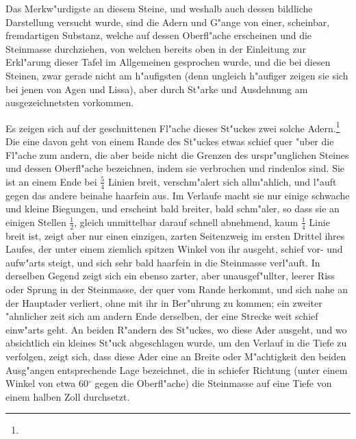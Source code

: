 \documentclass[a4paper, 11pt, oneside, german]{article}
\begin{document}
Das Merkw"urdigste an diesem Steine, und weshalb auch dessen bildliche Darstellung versucht wurde, sind die Adern und G"ange von einer, scheinbar, fremdartigen Substanz, welche auf dessen Oberfl"ache erscheinen und die Steinmasse durchziehen, von welchen bereits oben in der Einleitung zur Erkl"arung dieser Tafel im Allgemeinen gesprochen wurde, und die bei diesen Steinen, zwar gerade nicht am h"aufigsten (denn ungleich h"aufiger zeigen sie sich bei jenen von Agen und Lissa), aber durch St"arke und Ausdehnung am ausgezeichnetsten vorkommen.

Es zeigen sich auf der geschnittenen Fl"ache dieses St"uckes zwei solche Adern.\footnote{} Die eine davon geht von einem Rande des St"uckes etwas schief quer "uber die Fl"ache zum andern, die aber beide nicht die Grenzen des urspr"unglichen Steines und dessen Oberfl"ache bezeichnen, indem sie verbrochen und rindenlos sind. Sie ist an einem Ende bei $\frac{5}{4}$ Linien breit, verschm"alert sich allm"ahlich, und l"auft gegen das andere beinahe haarfein aus. Im Verlaufe macht sie nur einige schwache und kleine Biegungen, und erscheint bald breiter, bald schm"aler, so dass sie an einigen Stellen $\frac{1}{2}$, gleich unmittelbar darauf schnell abnehmend, kaum $\frac{1}{4}$ Linie breit ist, zeigt aber nur einen einzigen, zarten Seitenzweig im ersten Drittel ihres Laufes, der unter einem ziemlich spitzen Winkel von ihr ausgeht, schief vor- und aufw"arts steigt, und sich sehr bald haarfein in die Steinmasse verl"auft. In derselben Gegend zeigt sich ein ebenso zarter, aber unausgef"ullter, leerer Riss oder Sprung in der Steinmasse, der quer vom Rande herkommt, und sich nahe an der Hauptader verliert, ohne mit ihr in Ber"uhrung zu kommen; ein zweiter "ahnlicher zeit sich am andern Ende derselben, der eine Strecke weit schief einw"arts geht. An beiden R"andern des St"uckes, wo diese Ader ausgeht, und wo absichtlich ein kleines St"uck abgeschlagen wurde, um den Verlauf in die Tiefe zu verfolgen, zeigt sich, dass diese Ader eine an Breite oder M"achtigkeit den beiden Ausg"angen entsprechende Lage bezeichnet, die in schiefer Richtung (unter einem Winkel von etwa 60$^{\circ}$ gegen die Oberfl"ache) die Steinmasse auf eine Tiefe von einem halben Zoll durchsetzt.
\end{document}
